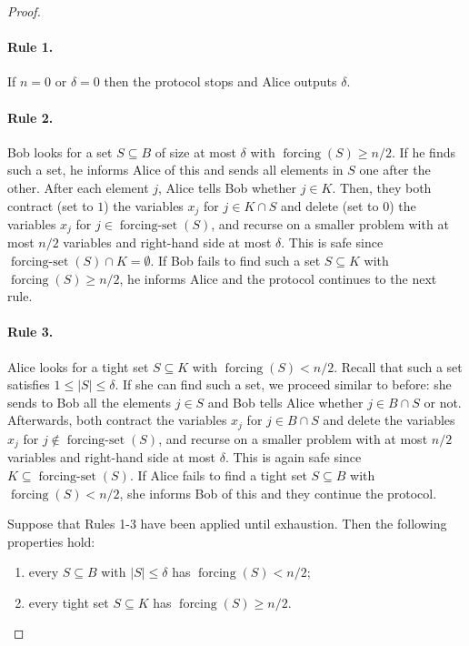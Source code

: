 \documentclass[11pt]{article}
\DeclareMathOperator{\forcing}{forcing}
\DeclareMathOperator{\forcingset}{forcing-set}
\newcommand{\rhs}{\delta}
\theoremstyle{remark}
\begin{document}
\begin{proof}
\paragraph{Rule 1.} If $n = 0$ or $\rhs = 0$ then the protocol stops and Alice outputs $\rhs$. 

\paragraph{Rule 2.} Bob looks for a set $S \subseteq B$ of size at most $\rhs$ with $\forcing(S) \ge n/2$. 
If he finds such a set, he informs Alice of this and sends all elements in $S$ one after the other.
After each element $j$, Alice tells Bob whether $j\in K$.
Then, they both contract (set to $1$) the variables $x_j$ for $j \in K \cap S$ and delete (set to $0$) the variables $x_j$ for $j \in \forcingset(S)$, and recurse on a smaller problem with at most $n/2$ variables and right-hand side at most $\rhs$. This is safe since $\forcingset(S) \cap K = \emptyset$. 
If Bob fails to find such a set $S \subseteq K$ with $\forcing(S) \ge n/2$, he informs Alice and the protocol continues to the next rule.

\paragraph{Rule 3.} Alice looks for a tight set $S \subseteq K$ with $\forcing(S) < n/2$. Recall that such a set satisfies $1 \le |S| \le \rhs$. If she can find such a set, we proceed similar to before: she sends to Bob all the elements $j\in S$ and Bob tells Alice whether $j \in B \cap S$ or not. Afterwards, both contract the variables $x_j$ for $j \in B \cap S$ and delete the variables $x_j$ for $j \notin \forcingset(S)$, and recurse on a smaller problem with at most $n/2$ variables and right-hand side at most $\rhs$. This is again safe since $K \subseteq \forcingset(S)$. If Alice fails to find a tight set $S \subseteq B$ with $\forcing(S) < n/2$, she informs Bob of this and they continue the protocol.

Suppose that Rules 1-3 have been applied until exhaustion. Then the following properties hold:
%
\begin{enumerate}[(P1)]
\item every $S \subseteq B$ with $|S| \le \rhs$ has $\forcing(S) < n/2$;
\item every tight set $S \subseteq K$ has $\forcing(S) \ge n/2$.
\end{enumerate}


\end{proof}
\end{document}
